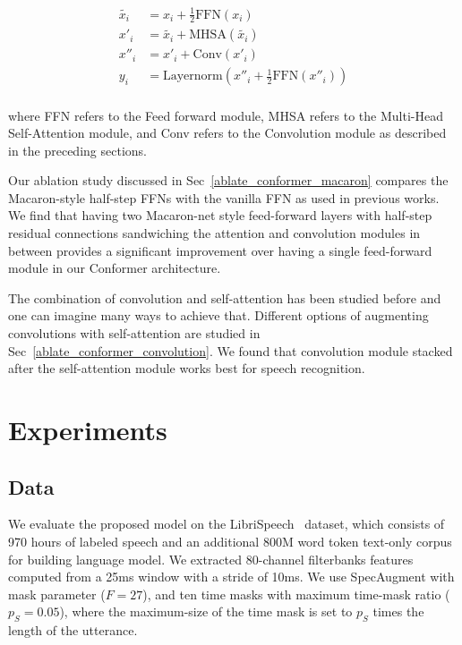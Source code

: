 \begin{equation}
\begin{split}
    \tilde{x_{i}}&= x_{i} + \frac{1}{2}\mathrm{FFN}(x_{i})    \\
    x'_{i}&= \tilde{x_{i}} + \mathrm{MHSA}(\tilde{x_{i}})    \\
    x''_{i}&= x'_{i} + \mathrm{Conv}(x'_{i})    \\
    y_{i}&= \mathrm{Layernorm}(x''_{i} + \frac{1}{2}\mathrm{FFN}(x''_{i}))    \\
\end{split}
\label{model:conformer:equation}
\end{equation}

where FFN refers to the Feed forward module, MHSA refers to the Multi-Head Self-Attention module, and Conv refers to the Convolution module as described in the preceding sections.

Our ablation study discussed in Sec~\ref{ablate_conformer_macaron} compares the Macaron-style half-step FFNs with the vanilla FFN as used in previous works. We find that having two Macaron-net style feed-forward layers with half-step residual connections sandwiching the attention and convolution modules in between provides a significant improvement over having a single feed-forward module in our Conformer architecture.

The combination of convolution and self-attention has been studied before and one can imagine many ways to achieve that. Different options of augmenting convolutions with self-attention are studied in Sec~\ref{ablate_conformer_convolution}.
We found that convolution module stacked after the self-attention module works best for speech recognition.

\section{Experiments}
\vskip -0.1in
\label{sec:experiment}
\subsection{Data}
We evaluate the proposed model on the LibriSpeech~\cite{panayotov2015librispeech} dataset, which consists of 970 hours of labeled speech and an additional 800M word token text-only corpus for building language model. We extracted 80-channel filterbanks features computed from a 25ms window with a stride of 10ms. We use SpecAugment \cite{park2019specaugment, largespecaugment} with mask parameter ($F=27$), and ten time masks with maximum time-mask ratio ($p_S = 0.05$), where the maximum-size of the time mask is set to $p_S$ times the length of the utterance.


